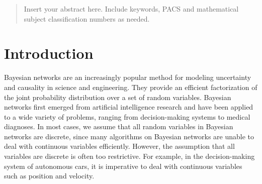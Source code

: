 \author{First Author         \and
        Second Author         \and
        Third Author%
}



\date{Received: date / Accepted: date}


\maketitle

\begin{abstract}
Insert your abstract here. Include keywords, PACS and mathematical
subject classification numbers as needed.
\end{abstract}

\section{Introduction}
\label{intro}
Bayesian networks \citep{Pearl_1988, PGM_2009}  are an increasingly popular method for modeling uncertainty and causality in science and engineering. They provide an efficient factorization of the joint probability distribution over a set of random variables. Bayesian networks first emerged from artificial intelligence research and have been applied to a wide variety of problems, ranging from decision-making systems \citep{DMU_2015} to medical diagnoses. In most cases, we assume that all random variables in Bayesian networks are discrete, since many algorithms on Bayesian networks are unable to deal with continuous variables efficiently. However, the assumption that all variables are discrete is often too restrictive. For example, in the decision-making system of autonomous cars, it is imperative to deal with continuous variables such as position and velocity.

